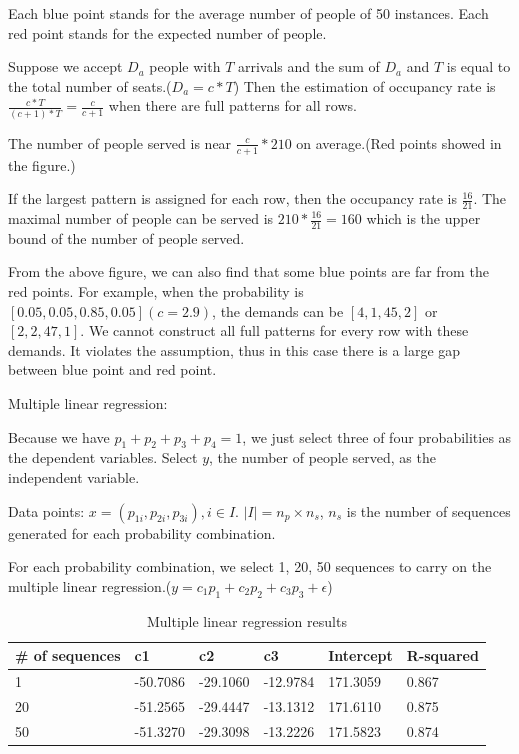 Each blue point stands for the average number of people of 50 instances.
Each red point stands for the expected number of people.

Suppose we accept $D_a$ people with $T$ arrivals and the sum of $D_a$ and $T$ is equal to the total number of seats.($D_a = c * T$) Then the estimation of occupancy rate is $\frac{c * T}{(c+1) * T}= \frac{c}{c+1}$ when there are full patterns for all rows.


The number of people served is near $\frac{c}{c+1} * 210$ on average.(Red points showed in the figure.) 

If the largest pattern is assigned for each row, then the occupancy rate is $\frac{16}{21}$. The maximal number of people can be served is $210 * \frac{16}{21} =160$ which is the upper bound of the number of people served.

From the above figure, we can also find that some blue points are far from the red points. For example, when the probability is $[0.05, 0.05, 0.85, 0.05](c =2.9)$, the demands can be $[4, 1, 45, 2]$ or $[2, 2, 47, 1]$. We cannot construct all full patterns for every row with these demands. It violates the assumption, thus in this case there is a large gap between blue point and red point.






Multiple linear regression:

Because we have $p_1 + p_2 + p_3 + p_4 =1$, we just select three of four probabilities as the dependent variables. Select $y$, the number of people served, as the independent variable.

Data points: $x = (p_{1i}, p_{2i}, p_{3i}), i \in I$. $|I| = n_p \times n_s$, $n_s$ is the number of sequences generated for each probability combination.

For each probability combination, we select 1, 20, 50 sequences to carry on the multiple linear regression.($y = c_1 p_1 + c_2 p_2 + c_3 p_3 + \epsilon$)

\begin{table}[ht]
  \centering
  \caption{Multiple linear regression results}
  \begin{tabular}{|l|l|l|l|l|l|}
  \hline
  \# of sequences & c1 & c2 & c3 & Intercept & R-squared \\
  \hline
  1  & -50.7086 & -29.1060 & -12.9784 & 171.3059 & 0.867 \\
  20 & -51.2565 & -29.4447 & -13.1312 &  171.6110 & 0.875\\
  50 & -51.3270 & -29.3098 & -13.2226 & 171.5823 & 0.874\\
  \hline
  \end{tabular}
\end{table}

